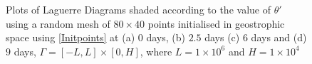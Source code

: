 \begin{figure}
	\centering
	\\
	\\
	\caption{Plots of Laguerre Diagrams shaded according to the value of $\theta '$ using a random mesh of $80 \times 40$ points initialised in geostrophic space using \ref{Initpoints} at (a) $0$ days, (b) $2.5$ days (c) $6$ days and (d) $9$ days, $\Gamma = [-L,L]\times[0,H]$, where $L = 1\times10^6$ and $H = 1\times10^4$}
	\label{fig: thetap ldiag2}
\end{figure}

